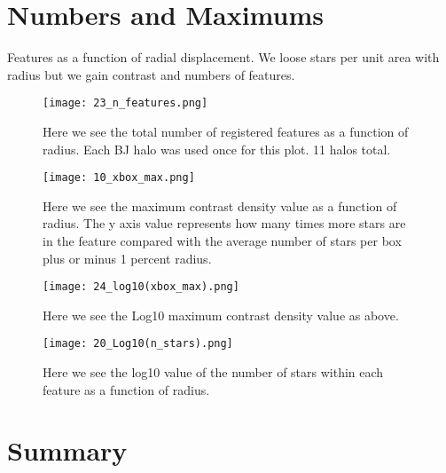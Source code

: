 \documentclass[11pt,a4paper,fleqn,notitlepage,oneside]{article}
\begin{document}
\maketitle











\section{Numbers and Maximums} %
	\label{sec:numbers}
	Features as a function of radial displacement.
	We loose stars per unit area with radius but we gain contrast and numbers of features.

	\begin{figure}[H]
		\texttt{[image: 23\_n\_features.png]}
		\caption{
			Here we see the total number of registered features as a function of radius.
			Each BJ halo was used once for this plot.
			11 halos total.
		}
		\label{fig:n_features}
	\end{figure}
	\begin{figure}[H]
		\texttt{[image: 10\_xbox\_max.png]}
		\caption{
			Here we see the maximum contrast density value as a function of radius.
			The y axis value represents how many times more stars are in the feature compared with the average number of stars per box plus or minus 1 percent radius. 
		}
		\label{fig:xbox_max}
	\end{figure}

	\begin{figure}[H]
		\texttt{[image: 24\_log10(xbox\_max).png]}
		\caption{
			Here we see the Log10 maximum contrast density value as above. 
		}
		\label{fig:24_log10(xbox_max)}
	\end{figure}

	\begin{figure}[H]
		\texttt{[image: 20\_Log10(n\_stars).png]}
		\caption{
			Here we see the log10 value of the number of stars within each feature as a function of radius. 
		}
		\label{fig:n_stars}
	\end{figure}



\section{Summary} %
	\label{sec:summary}
\end{document}

